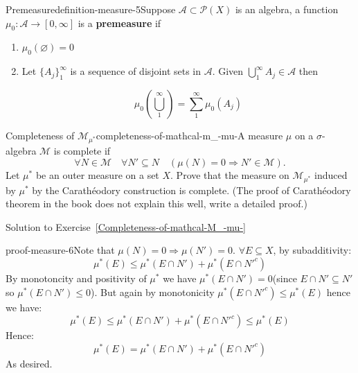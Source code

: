 \begin{mystthmdefinition}{Premeasure}{definition-measure-5}Suppose $\mathcal A\subset \mathcal P(X)$ is an algebra, a function $\mu_0 : \mathcal A\to [0,\infty]$ is a \textbf{premeasure} if

\begin{enumerate}
\item $\mu_0(\varnothing)=0$
\item Let $\{A_j\}_1^{\infty}$ is a sequence of disjoint sets in $\mathcal A$. Given $\bigcup_1^{\infty} A_j \in \mathcal A$ then

\begin{equation}
\mu_0 \left( \bigcup_1^{\infty}\right) = \sum_{1}^{\infty} \mu_0(A_j)
\end{equation}
\end{enumerate}

\end{mystthmdefinition}
\begin{mystexercise}{Completeness of $\mathcal M_{\mu^*}$}{completeness-of-mathcal-m_-mu-}\label{Completeness-of-mathcal-M_-mu-}\label{completeness-of-mathcal-m_-mu-}A measure $\mu$ on a $\sigma$-algebra $\mathcal{M}$ is complete if
\begin{equation}
\forall N \in \mathcal{M} \quad \forall N' \subseteq N \quad (\mu(N) = 0 \Rightarrow N' \in \mathcal{M}).
\end{equation}
Let $\mu^*$ be an outer measure on a set $X$. Prove that the measure on $\mathcal{M}_{\mu^*}$ induced by $\mu^*$ by the Carathéodory construction is complete. (The proof of Carathéodory theorem in the book does not explain this well, write a detailed proof.)

\end{mystexercise}
\begin{mystsolution}{Solution to Exercise~\ref{Completeness-of-mathcal-M_-mu-}}\begin{mystthmproof}{}{proof-measure-6}Note that $\mu(N)=0\Longrightarrow \mu(N')=0$. $\forall E\subseteq X$, by subadditivity:
\begin{equation}
\mu^*(E) \leq \mu^*(E\cap N') + \mu^*(E\cap N'^c)
\end{equation}
By monotoncity and positivity of $\mu^*$ we have $\mu^*(E\cap N')=0$(since $E\cap N' \subseteq N'$ so $\mu^*(E\cap N')\leq 0$). But again by monotonicity $\mu^*(E\cap N'^c) \leq \mu^*(E)$ hence we have:
\begin{equation}
\mu^*(E) \leq \mu^*(E\cap N') + \mu^*(E\cap N'^c) \leq \mu^*(E)
\end{equation}
Hence:
\begin{equation}
\mu^*(E) = \mu^*(E\cap N') + \mu^*(E\cap N'^c)
\end{equation}
As desired.

\end{mystthmproof}
\end{mystsolution}
